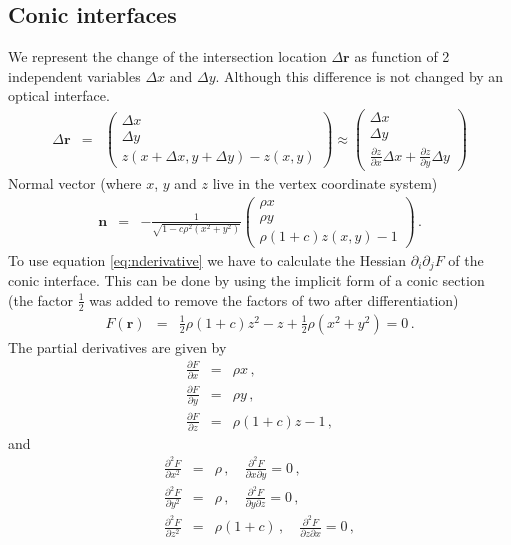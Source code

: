 \documentclass[12pt,a4paper,twoside,openright,BCOR10mm,headsepline,titlepage,abstracton,chapterprefix,final]{scrreprt}
\newcommand\Vector[1]{{\mathbf{#1}}}
\begin{document}
\subsection{Conic interfaces}

We represent the change of the intersection location $\Delta\Vector{r}$ as function of 2 independent variables $\Delta x$ and $\Delta y$.
Although this difference is not changed by an optical interface.
\begin{eqnarray}
 \Delta\Vector{r} &=&
 \begin{pmatrix}
  \Delta x \\ \Delta y \\ z(x+\Delta x,y+\Delta y) - z(x,y)
 \end{pmatrix}
 \approx 
 \begin{pmatrix}
  \Delta x \\ \Delta y \\ \frac{\partial z}{\partial x} \Delta x + \frac{\partial z}{\partial y} \Delta y
 \end{pmatrix}
\end{eqnarray}
Normal vector (where $x$, $y$ and $z$ live in the vertex coordinate system)
\begin{eqnarray}
 \Vector{n} &=&- \frac{1}{\sqrt{ 1 - c \rho^2 (x^2 + y^2)}} 
  \begin{pmatrix}
   \rho x \\
   \rho y \\
   \rho ( 1 + c ) z(x,y) - 1
  \end{pmatrix}\,.
\end{eqnarray}
To use equation \eqref{eq:nderivative} we have to calculate the Hessian $\partial_i \partial_j F$ of the conic interface.
This can be done by using the implicit form of a conic section (the factor $\tfrac{1}{2}$ was added to remove the factors of two after
differentiation)
\begin{eqnarray}
 F(\Vector{r}) &=& \frac{1}{2}\rho (1+c) z^2 - z + \frac{1}{2} \rho(x^2 + y^2) = 0\,.
\end{eqnarray}
The partial derivatives are given by
\begin{eqnarray}
 \frac{\partial F}{\partial x} &=& \rho x\,,\\
 \frac{\partial F}{\partial y} &=& \rho y\,,\\
 \frac{\partial F}{\partial z} &=& \rho (1+c) z - 1\,,
\end{eqnarray}
and
\begin{eqnarray}
 \frac{\partial^2 F}{\partial x^2} &=& \rho\,, \quad\frac{\partial^2 F}{\partial x \partial y} = 0\,,\\
 \frac{\partial^2 F}{\partial y^2} &=& \rho\,, \quad\frac{\partial^2 F}{\partial y \partial z} = 0\,,\\
 \frac{\partial^2 F}{\partial z^2} &=& \rho (1+c)\,, \quad\frac{\partial^2 F}{\partial z \partial x} = 0\,,
\end{eqnarray}
\end{document}

